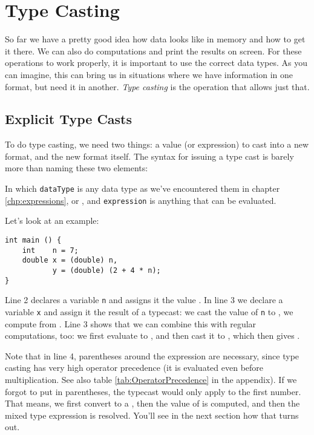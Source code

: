 {\section{Type Casting}
So far we have a pretty good idea how data looks like in memory and how to get it there. We can also do computations and print the results on screen. For these operations to work properly, it is important to use the correct data types. As you can imagine, this can bring us in situations where we have information in one format, but need it in another. \emph{Type casting} is the operation that allows just that.

\subsection{Explicit Type Casts}
To do type casting, we need two things: a value (or expression) to cast into a new format, and the new format itself. The syntax for issuing a type cast is barely more than naming these two elements:
\begin{codebox}
\end{codebox}
In which \texttt{dataType} is any data type as we've encountered them in chapter \ref{chp:expressions}, \eg {} or , and \texttt{expression} is anything that can be evaluated.

Let's look at an example:
\begin{codebox}[typecast.c]
\begin{verbatim}
int main () {
    int    n = 7;
    double x = (double) n,
           y = (double) (2 + 4 * n);
}
\end{verbatim}
\end{codebox}
Line 2 declares a  variable \texttt{n} and assigns it the value . In line 3 we declare a  variable \texttt{x} and assign it the result of a typecast: we cast the value of \texttt{n} to , \ie we compute  from . Line 3 shows that we can combine this with regular computations, too: we first evaluate  to , and then cast it to , which then gives .

Note that in line 4, parentheses around the expression are necessary, since type casting has very high operator precedence (\ie it is evaluated even before multiplication. See also table \ref{tab:OperatorPrecedence} in the appendix). If we forgot to put  in parentheses, the typecast would only apply to the first number. That means, we first convert  to a , then the  value of  is computed, and then the mixed type expression  is resolved. You'll see in the next section how that turns out.

}
